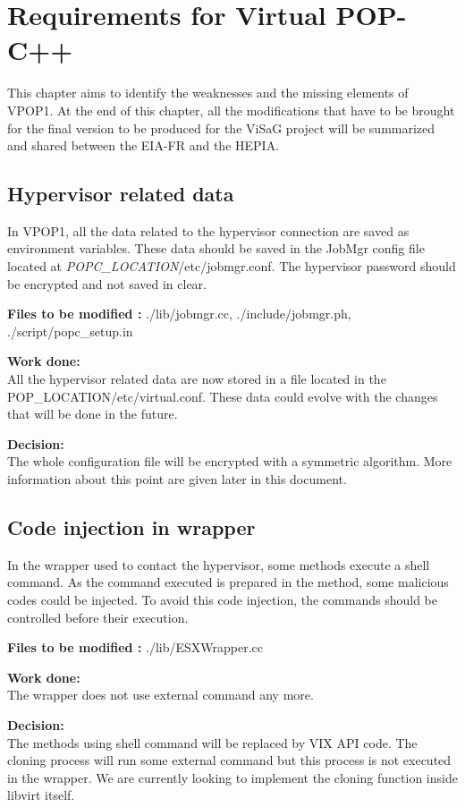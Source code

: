 
\section{Requirements for Virtual POP-C++}
\label{weakness}
This chapter aims to identify the weaknesses and the missing elements of VPOP1. At the end of this chapter, all the modifications that have to be brought for the final version to be produced for the ViSaG project will be summarized and shared between the EIA-FR and the HEPIA.\s


\subsection{Hypervisor related data}
In VPOP1, all the data related to the hypervisor connection are saved as environment variables. These data should be saved in the JobMgr config file located at \textit{POPC\_LOCATION}/etc/jobmgr.conf. The hypervisor password should be encrypted and not saved in clear.\s

\textbf{Files to be modified :} ./lib/jobmgr.cc, ./include/jobmgr.ph, ./script/popc\_setup.in\s

\textbf{Work done:}\\
All the hypervisor related data are now stored in a file located in the POP\_LOCATION/etc/virtual.conf. These data could evolve with the changes that will be done in the future. \s

\textbf{Decision:}\\
The whole configuration file will be encrypted with a symmetric algorithm. More information about this point are given later in this document. 

\subsection{Code injection in wrapper}
In the wrapper used to contact the hypervisor, some methods execute a shell command. As the command executed is prepared in the method, some malicious codes could be injected. To avoid this code injection, the commands should be controlled before their execution.\s

\textbf{Files to be modified : } ./lib/ESXWrapper.cc\s

\textbf{Work done:}\\
The wrapper does not use external command any more. \s

\textbf{Decision:}\\
The methods using shell command will be replaced by VIX API code. The cloning process will run some external command but this process is not executed in the wrapper. We are currently looking to implement the cloning function inside libvirt itself. 

